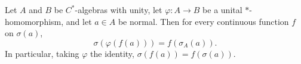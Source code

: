 Let $A$ and $B$ be $C^*$-algebras with unity, let $\varphi: A \to B$ be a unital $*$-homomorphism, and let $a \in A$ be normal. Then for every continuous function $f$ on $\sigma(a)$,
$$\sigma(\varphi(f(a))) = f(\sigma_A(a)).$$
In particular, taking $\varphi$ the identity, $\sigma(f(a)) = f(\sigma(a))$.
